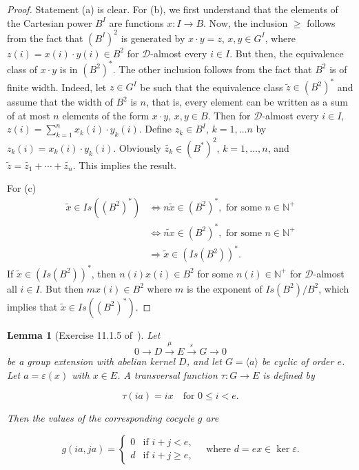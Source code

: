 \documentclass{article}
\newtheorem{lemma}[theorem]{Lemma}
\theoremstyle{remark}
\def\N{{\mathbb{N}}}
\def\D{{\mathcal{D}}}
\begin{document}
 \begin{proof} Statement (a) is clear. For (b), we first understand that the elements of the Cartesian power $B^I$ are functions $x: I \to B$. Now, the inclusion $\geq$ follows from the fact that $(B^I)^2$ is generated by $x\cdot y=z$, $x, y\in G^I$, where $z(i)=x(i)\cdot y(i)\in B^2$ for $\D$-almost every $i\in I$. But then, the equivalence class of $x\cdot y$ is in $(B^2)^*$. The other inclusion follows from the fact that $B^2$ is of finite width. Indeed, let $z\in G^I$ be such that the equivalence class $\tilde{z}\in (B^2)^*$ and assume that the width of $B^2$ is $n$, that is, every element can be written as a sum of at most $n$ elements of the form $x\cdot y$, $x,y\in B$. Then for $\D$-almost every $i\in I$, $z(i)=\sum_{k=1}^n x_k(i)\cdot y_k(i)$. Define $z_k\in B^I$, $k=1,\ldots n$ by $z_k(i)=x_k(i)\cdot y_k(i)$. Obviously $\widetilde{z_k}\in (B^*)^2$, $k=1, \ldots ,n$, and $\tilde{z}=\widetilde{z_1}+\cdots+ \widetilde{z_n}$. This implies the result.      

For (c)
\begin{align*}
\tilde{x}\in Is((B^2)^*)&\Leftrightarrow n\tilde{x}\in (B^2)^*, \text{ for some $n\in \N^+$}\\
&\Leftrightarrow \widetilde{nx}\in (B^2)^*,  \text{ for some $n\in \N^+$}\\ &\Rightarrow \tilde{x}\in (Is(B^2))^*.   
\end{align*}
If $\tilde{x}\in (Is(B^2))^*$, then $n(i)x(i)\in B^2$ for some $n(i)\in \N^+$ for $\D$-almost all $i\in I$. But then $mx(i)\in B^2$ where $m$ is the exponent of $Is(B^2)/B^2$, which implies that $\tilde{x}\in Is((B^2)^*)$.
\end{proof}
\begin{lemma}[Exercise 11.1.5 of~\cite{robin}]\label{cocycle:lem}
Let 
\[
0\to D \xrightarrow{\mu} E \xrightarrow{\varepsilon} G\to 0
\]
be a group extension with abelian kernel $ D$, and let $ G = \langle a \rangle $ be cyclic of order $ e$. Let $a= \varepsilon(x) $ with \( x \in E \). A transversal function \( \tau: G \rightarrow E \) is defined by

\[
\tau(ia) = ix \quad \text{for } 0 \leq i < e.
\]

Then the values of the corresponding cocycle $g$ are


\[
g(ia, ja) = 
\begin{cases} 
0 & \text{if } i + j < e, \\
d & \text{if } i + j \geq e,
\end{cases}
\quad \text{where } d = ex \in \ker \varepsilon.
\]
\end{lemma}
\end{document}
